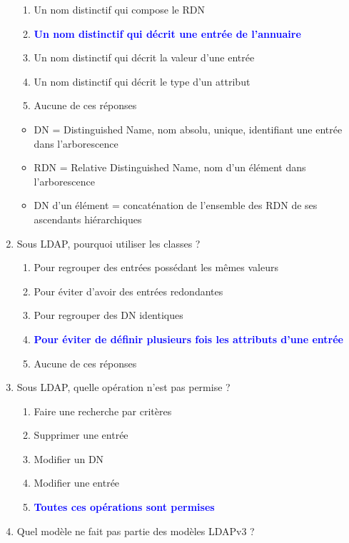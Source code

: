 \documentclass[a4paper]{article}
\begin{document}
\begin{enumerate}
\begin{enumerate}
        \item Un nom distinctif qui compose le RDN
        \item \textcolor{blue}{\textbf{Un nom distinctif qui décrit une entrée de l'annuaire}}
        \item Un nom distinctif qui décrit la valeur d'une entrée
        \item Un nom distinctif qui décrit le type d'un attribut
        \item Aucune de ces réponses
    \end{enumerate}
    \begin{example} \begin{itemize}
        \item DN = Distinguished Name, nom absolu, unique, identifiant une entrée dans l'arborescence
        \item RDN = Relative Distinguished Name, nom d'un élément dans l'arborescence
        \item DN d'un élément = concaténation de l'ensemble des RDN de ses ascendants hiérarchiques
    \end{itemize} \end{example}
    \item Sous LDAP, pourquoi utiliser les classes ?
    \begin{enumerate}
        \item Pour regrouper des entrées possédant les mêmes valeurs
        \item Pour éviter d'avoir des entrées redondantes
        \item Pour regrouper des DN identiques
        \item \textcolor{blue}{\textbf{Pour éviter de définir plusieurs fois les attributs d'une entrée}}
        \item Aucune de ces réponses
    \end{enumerate}
    \item Sous LDAP, quelle opération n'est pas permise ?
    \begin{enumerate}
        \item Faire une recherche par critères
        \item Supprimer une entrée
        \item Modifier un DN
        \item Modifier une entrée
        \item \textcolor{blue}{\textbf{Toutes ces opérations sont permises}}
    \end{enumerate}
    \item Quel modèle ne fait pas partie des modèles LDAPv3 ?

\end{enumerate}
\end{document}
